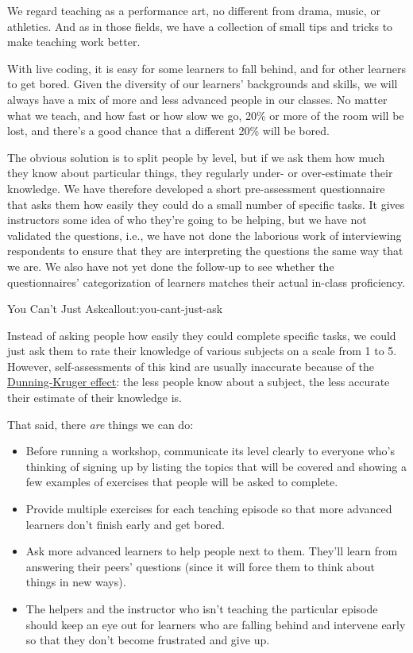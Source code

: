 
We regard teaching as a performance art, no different from drama, music,
or athletics. And as in those fields, we have a collection of small tips
and tricks to make teaching work better.


With live coding, it is easy for some learners to fall behind, and for
other learners to get bored. Given the diversity of our learners'
backgrounds and skills, we will always have a mix of more and less
advanced people in our classes. No matter what we teach, and how fast or
how slow we go, 20\% or more of the room will be lost, and there's a
good chance that a different 20\% will be bored.

The obvious solution is to split people by level, but if we ask them how
much they know about particular things, they regularly under- or
over-estimate their knowledge. We have therefore developed a short
pre-assessment questionnaire that asks them how easily they could do a
small number of specific tasks. It gives instructors some idea of who
they're going to be helping, but we have not validated the questions,
i.e., we have not done the laborious work of interviewing respondents to
ensure that they are interpreting the questions the same way that we
are. We also have not yet done the follow-up to see whether the
questionnaires' categorization of learners matches their actual in-class
proficiency.

\begin{callout}{You Can't Just Ask}{callout:you-cant-just-ask}

Instead of asking people how easily they could complete specific tasks,
we could just ask them to rate their knowledge of various subjects on a
scale from 1 to 5. However, self-assessments of this kind are usually
inaccurate because of the
\href{https://en.wikipedia.org/wiki/Dunning\%E2\%80\%93Kruger\_effect}{Dunning-Kruger
effect}: the less people know about a subject, the less accurate their
estimate of their knowledge is.
\end{callout}

That said, there \emph{are} things we can do:

\begin{itemize}
\item
  Before running a workshop, communicate its level clearly to everyone
  who's thinking of signing up by listing the topics that will be
  covered and showing a few examples of exercises that people will be
  asked to complete.
\item
  Provide multiple exercises for each teaching episode so that more
  advanced learners don't finish early and get bored.
\item
  Ask more advanced learners to help people next to them. They'll learn
  from answering their peers' questions (since it will force them to
  think about things in new ways).
\item
  The helpers and the instructor who isn't teaching the particular
  episode should keep an eye out for learners who are falling behind and
  intervene early so that they don't become frustrated and give up.
\end{itemize}

